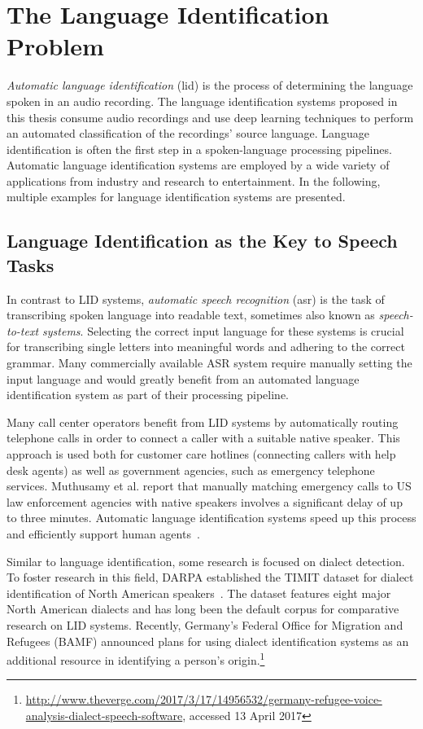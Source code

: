 \section{The Language Identification Problem}
\label{sec:lid}

\emph{Automatic language identification} (\ac{lid}) is the process of determining the language spoken in an audio recording. The language identification systems proposed in this thesis consume audio recordings and use deep learning techniques to perform an automated classification of the recordings' source language.
Language identification is often the first step in a spoken-language processing pipelines. Automatic language identification systems are employed by a wide variety of applications from industry and research to entertainment.
In the following, multiple examples for language identification systems are presented.

\subsection{Language Identification as the Key to Speech Tasks}
In contrast to LID systems, \emph{automatic speech recognition} (\ac{asr}) is the task of transcribing spoken language into readable text, sometimes also known as \emph{speech-to-text systems}. Selecting the correct input language for these systems is crucial for transcribing single letters into meaningful words and adhering to the correct grammar. Many commercially available ASR system require manually setting the input language and would greatly benefit from an automated language identification system as part of their processing pipeline.

Many call center operators benefit from LID systems by automatically routing telephone calls in order to connect a caller with a suitable native speaker. This approach is used both for customer care hotlines (connecting callers with help desk agents) as well as government agencies, such as emergency telephone services. Muthusamy et al. report that manually matching emergency calls to US law enforcement agencies with native speakers involves a significant delay of up to three minutes. Automatic language identification systems speed up this process and efficiently support human agents~\cite{muthusamy1994reviewing}.

Similar to language identification, some research is focused on dialect detection. To foster research in this field, DARPA established the TIMIT dataset for dialect identification of North American speakers~\cite{garofolo1993darpa}. The dataset features eight major North American dialects and has long been the default corpus for comparative research on LID systems.
Recently, Germany's Federal Office for Migration and Refugees (BAMF) announced plans for using dialect identification systems as an additional resource in identifying a person's origin.\footnote{\url{http://www.theverge.com/2017/3/17/14956532/germany-refugee-voice-analysis-dialect-speech-software}, accessed 13 April 2017}

